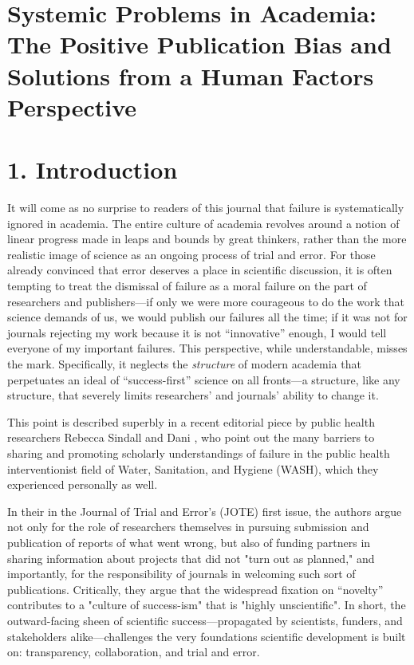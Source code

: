\documentclass{article}
\begin{document}
  \section{Systemic Problems in Academia: The Positive Publication Bias and Solutions from a Human Factors Perspective }

\section{1. Introduction}

It will come as no surprise to readers of this journal that failure is systematically ignored in academia. The entire culture of academia revolves around a notion of linear progress made in leaps and bounds by great thinkers, rather than the more realistic image of science as an ongoing process of trial and error. For those already convinced that error deserves a place in scientific discussion, it is often tempting to treat the dismissal of failure as a moral failure on the part of researchers and publishers—if only we were more courageous to do the work that science demands of us, we would publish our failures all the time; if it was not for journals rejecting my work because it is not “innovative” enough, I would tell everyone of my important failures. This perspective, while understandable, misses the mark. Specifically, it neglects the \emph{structure }of modern academia that perpetuates an ideal of “success-first” science on all fronts—a structure, like any structure, that severely limits researchers' and journals' ability to change it. 

This point is described superbly in a recent editorial piece by public health researchers Rebecca Sindall and Dani \parencite{Barrington2020}, who point out the many barriers to sharing and promoting scholarly understandings of failure in the public health interventionist field of Water, Sanitation, and Hygiene (WASH), which they experienced personally as well. 

In their  in the Journal of Trial and Error's (JOTE) first issue, the authors argue not only for the role of researchers themselves in pursuing submission and publication of reports of what went wrong, but also of funding partners in sharing information about projects that did not "turn out as planned," and importantly, for the responsibility of journals in welcoming such sort of publications. Critically, they argue that the widespread fixation on “novelty” contributes to a "culture of success-ism" that is "highly unscientific". In short, the outward-facing sheen of scientific success—propagated by scientists, funders, and stakeholders alike—challenges the very foundations scientific development is built on: transparency, collaboration, and trial and error.
\end{document}
